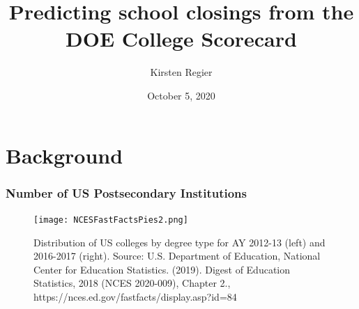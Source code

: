 \documentclass{beamer}
\title[College Scorecard]{Predicting school closings from the DOE College Scorecard} %
\author{Kirsten Regier} %
\date{October 5, 2020} %
\begin{document}
\begin{frame}
\titlepage %
\end{frame}


\section{Background} %
\begin{frame}
\frametitle{Number of US Postsecondary Institutions}

\begin{figure}
\begin{center}
\texttt{[image: NCESFastFactsPies2.png]}
\caption{Distribution of US colleges by degree type for AY 2012-13 (left) and 2016-2017 (right).  \newline
\tiny{Source: U.S. Department of Education, National Center for Education Statistics. (2019). Digest of Education Statistics, 2018 (NCES 2020-009), Chapter 2., https://nces.ed.gov/fastfacts/display.asp?id=84}}
\end{center}
\end{figure}

\end{frame}
\end{document}
